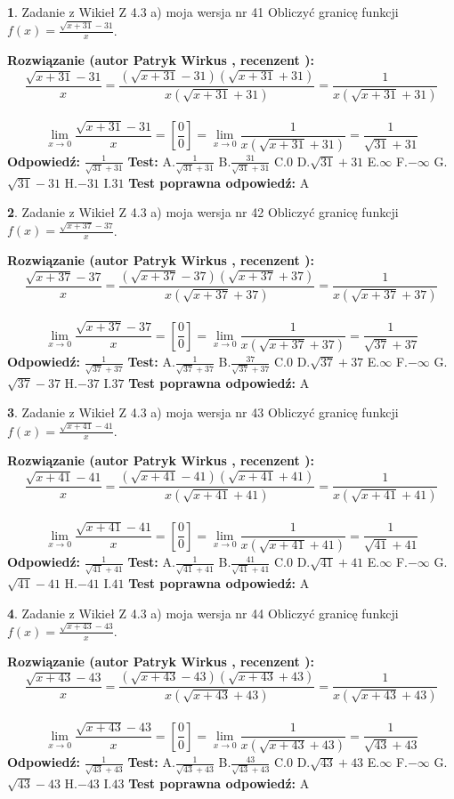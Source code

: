 \documentclass[12pt, a4paper]{article}
\theoremstyle{definition} %
\newtheorem{zad}{}
\newcommand{\zadStart}[1]{\begin{zad}#1\newline}
\newcommand{\zadStop}{\end{zad}}
\newcommand{\rozwStart}[2]{\noindent \textbf{Rozwiązanie (autor #1 , recenzent #2): }\newline}
\newcommand{\rozwStop}{\newline}
\newcommand{\odpStart}{\noindent \textbf{Odpowiedź:}\newline}
\newcommand{\odpStop}{\newline}
\newcommand{\testStart}{\noindent \textbf{Test:}\newline}
\newcommand{\testStop}{\newline}
\newcommand{\kluczStart}{\noindent \textbf{Test poprawna odpowiedź:}\newline}
\newcommand{\kluczStop}{\newline}
\begin{document}
\zadStart{Zadanie z Wikieł Z 4.3 a) moja wersja nr 41}
Obliczyć granicę funkcji $f(x)=\frac{\sqrt{x+31}-31}{x}$.
\zadStop
\rozwStart{Patryk Wirkus}{}
$$\frac{\sqrt{x+31}-31}{x}=\frac{(\sqrt{x+31}-31)(\sqrt{x+31}+31)}{x(\sqrt{x+31}+31)}=\frac{1}{x(\sqrt{x+31}+31)}$$
\\
$$\lim\limits_{x\to0}\frac{\sqrt{x+31}-31}{x}=[\frac{0}{0}]=
\lim\limits_{x\to0}\frac{1}{x(\sqrt{x+31}+31)} = \frac{1}{\sqrt{31}+31}$$
\rozwStop
\odpStart
$\frac{1}{\sqrt{31}+31}$
\odpStop
\testStart
A.$\frac{1}{\sqrt{31}+31}$
B.$\frac{31}{\sqrt{31}+31}$
C.$0$
D.$\sqrt{31}+31$
E.$\infty$
F.$-\infty$
G.$\sqrt{31}-31$
H.$-31$
I.$31$
\testStop
\kluczStart
A
\kluczStop



\zadStart{Zadanie z Wikieł Z 4.3 a) moja wersja nr 42}
Obliczyć granicę funkcji $f(x)=\frac{\sqrt{x+37}-37}{x}$.
\zadStop
\rozwStart{Patryk Wirkus}{}
$$\frac{\sqrt{x+37}-37}{x}=\frac{(\sqrt{x+37}-37)(\sqrt{x+37}+37)}{x(\sqrt{x+37}+37)}=\frac{1}{x(\sqrt{x+37}+37)}$$
\\
$$\lim\limits_{x\to0}\frac{\sqrt{x+37}-37}{x}=[\frac{0}{0}]=
\lim\limits_{x\to0}\frac{1}{x(\sqrt{x+37}+37)} = \frac{1}{\sqrt{37}+37}$$
\rozwStop
\odpStart
$\frac{1}{\sqrt{37}+37}$
\odpStop
\testStart
A.$\frac{1}{\sqrt{37}+37}$
B.$\frac{37}{\sqrt{37}+37}$
C.$0$
D.$\sqrt{37}+37$
E.$\infty$
F.$-\infty$
G.$\sqrt{37}-37$
H.$-37$
I.$37$
\testStop
\kluczStart
A
\kluczStop



\zadStart{Zadanie z Wikieł Z 4.3 a) moja wersja nr 43}
Obliczyć granicę funkcji $f(x)=\frac{\sqrt{x+41}-41}{x}$.
\zadStop
\rozwStart{Patryk Wirkus}{}
$$\frac{\sqrt{x+41}-41}{x}=\frac{(\sqrt{x+41}-41)(\sqrt{x+41}+41)}{x(\sqrt{x+41}+41)}=\frac{1}{x(\sqrt{x+41}+41)}$$
\\
$$\lim\limits_{x\to0}\frac{\sqrt{x+41}-41}{x}=[\frac{0}{0}]=
\lim\limits_{x\to0}\frac{1}{x(\sqrt{x+41}+41)} = \frac{1}{\sqrt{41}+41}$$
\rozwStop
\odpStart
$\frac{1}{\sqrt{41}+41}$
\odpStop
\testStart
A.$\frac{1}{\sqrt{41}+41}$
B.$\frac{41}{\sqrt{41}+41}$
C.$0$
D.$\sqrt{41}+41$
E.$\infty$
F.$-\infty$
G.$\sqrt{41}-41$
H.$-41$
I.$41$
\testStop
\kluczStart
A
\kluczStop



\zadStart{Zadanie z Wikieł Z 4.3 a) moja wersja nr 44}
Obliczyć granicę funkcji $f(x)=\frac{\sqrt{x+43}-43}{x}$.
\zadStop
\rozwStart{Patryk Wirkus}{}
$$\frac{\sqrt{x+43}-43}{x}=\frac{(\sqrt{x+43}-43)(\sqrt{x+43}+43)}{x(\sqrt{x+43}+43)}=\frac{1}{x(\sqrt{x+43}+43)}$$
\\
$$\lim\limits_{x\to0}\frac{\sqrt{x+43}-43}{x}=[\frac{0}{0}]=
\lim\limits_{x\to0}\frac{1}{x(\sqrt{x+43}+43)} = \frac{1}{\sqrt{43}+43}$$
\rozwStop
\odpStart
$\frac{1}{\sqrt{43}+43}$
\odpStop
\testStart
A.$\frac{1}{\sqrt{43}+43}$
B.$\frac{43}{\sqrt{43}+43}$
C.$0$
D.$\sqrt{43}+43$
E.$\infty$
F.$-\infty$
G.$\sqrt{43}-43$
H.$-43$
I.$43$
\testStop
\kluczStart
A
\kluczStop
\end{document}
